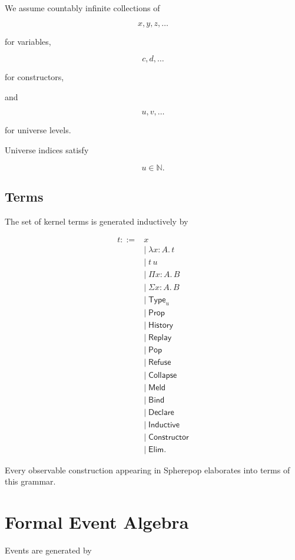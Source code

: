 \documentclass[12pt,oneside]{article}
\theoremstyle{definition}
\theoremstyle{remark}
\newcommand{\Type}{\mathsf{Type}}
\newcommand{\Prop}{\mathsf{Prop}}
\begin{document}
We assume countably infinite collections of

\[
x,y,z,\ldots
\]

for variables,

\[
c,d,\ldots
\]

for constructors,

and

\[
u,v,\ldots
\]

for universe levels.

Universe indices satisfy

\[
u\in\mathbb N.
\]

\subsection{Terms}

The set of kernel terms is generated inductively by

\[
\begin{aligned}
t ::= {} &
x
\\
&
\mid\;
\lambda x:A.\,t
\\
&
\mid\;
t\,u
\\
&
\mid\;
\Pi x:A.\,B
\\
&
\mid\;
\Sigma x:A.\,B
\\
&
\mid\;
\Type_u
\\
&
\mid\;
\Prop
\\
&
\mid\;
\mathsf{History}
\\
&
\mid\;
\mathsf{Replay}
\\
&
\mid\;
\mathsf{Pop}
\\
&
\mid\;
\mathsf{Refuse}
\\
&
\mid\;
\mathsf{Collapse}
\\
&
\mid\;
\mathsf{Meld}
\\
&
\mid\;
\mathsf{Bind}
\\
&
\mid\;
\mathsf{Declare}
\\
&
\mid\;
\mathsf{Inductive}
\\
&
\mid\;
\mathsf{Constructor}
\\
&
\mid\;
\mathsf{Elim}.
\end{aligned}
\]

Every observable construction appearing in Spherepop elaborates into terms of
this grammar.

\section{Formal Event Algebra}

Events are generated by
\end{document}
